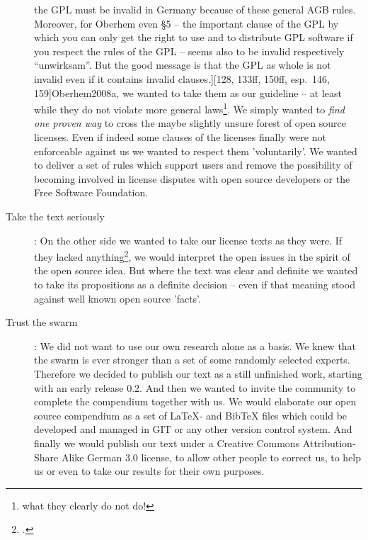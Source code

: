 \begin{description}
  the GPL must be invalid in Germany because of these general AGB rules.
  Moreover, for Oberhem even §5 -- the important clause of the GPL by which you
  can only get the right to use and to distribute GPL software if you respect
  the rules of the GPL -- seems also to be invalid respectively
  \enquote{unwirksam}. But the good message is that the GPL as whole is not
  invalid even if it contains invalid clauses.][128, 133ff, 150ff, esp.\ 146,
  159]{Oberhem2008a}, we wanted to take them as our guideline -- at least while
  they do not violate more general laws\footnote{what they clearly do not do!}.
  We simply wanted to \emph{find one proven way} to cross the maybe slightly
  unsure forest of open source licenses. Even if indeed some clauses of the
  licenses finally were not enforceable against us we wanted to respect them
  'voluntarily'. We wanted to deliver a set of rules which support users and
  remove the possibility of becoming involved in license disputes with open
  source developers or the Free Software Foundation.
  \item[Take the text seriously]: On the other side we wanted to take our
  license texts as they were. If they lacked anything\footcite[The systematical
  underdetermination of licenses is a problem being also known in the open
  source respectively Free Software movement. Following the biography of RMS his
  main judicial counselor Moglen has stated, that \enquote{there is uncertainty
  in every legal process (\ldots) } and that it seemed to be silly to try
  \enquote{(\ldots) to take out all the bugs (\ldots)}. Nevertheless -- so
  Moglen resp.\ Williams -- the goal of Richard Stallman was \enquote{the complete
  opposite}: He tried \enquote{(\ldots) to remove uncertainty which is
  inherently impossible}. But -- and that's the nub of this analysis --
  Moglen had to follow Stallmann because of RMS character. And he had to
  summarize their work so, that \enquote{(\ldots) the resulting elegance (of the
  GPL; KR.), the resulting simplicity (of the GPL; KR.) in design almost
  achieves what it has to achieve}. Hence we are asked to take the license
  texts themselves seriously. cf.][177f]{Williams2002a}, we would interpret the
  open issues in the spirit of the open source idea. But where the text was
  clear and definite we wanted to take its propositions as a definite decision --
  even if that meaning stood against well known open source 'facts'.
  \item[Trust the swarm]: We did not want to use our own research alone as a
  basis. We knew that the swarm is ever stronger than a set of some randomly
  selected experts. Therefore we decided to publish our text as a still
  unfinished work, starting with an early release 0.2. And then we wanted to
  invite the community to complete the compendium together with us. We would
  elaborate our open source compendium as a set of LaTeX- and BibTeX files which
  could be developed and managed in GIT or any other version control system. And
  finally we would publish our text under a Creative Commons Attribution-Share
  Alike German 3.0 license, to allow other people to correct us, to help us or
  even to take our results for their own purposes.
\end{description}

